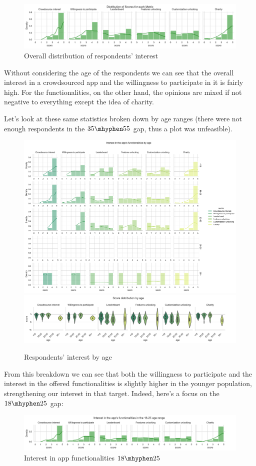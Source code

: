 \documentclass[a4paper, 11pt]{report}
\begin{document}
\begin{figure}[H]
	\centering
	\includegraphics[width=.9\textwidth]{img/analysis/distribution_of_scores_for_each_metric.pdf}
	\caption{Overall distribution of respondents' interest}
\end{figure}
\noindent Without considering the age of the respondents we can see that the
overall interest in a crowdsourced app and the willingness to participate in
it is fairly high. For the functionalities, on the other hand, the opinions are mixed if not negative
to everything except the idea of charity.

Let's look at these same statistics broken down by age ranges (there were not enough respondents in the $35 \mhyphen 55$ gap, thus a plot was unfeasible).
\begin{figure}[H]
	\centering
	\includegraphics[width=.8\textwidth]{img/analysis/interest_app_functionalities.pdf}\\
	\includegraphics[width=.9\textwidth]{img/analysis/score_distribution_by_age.pdf}
	\caption{Respondents' interest by age}
\end{figure}
From this breakdown we can see that both the willingness to participate and the interest in the offered functionalities is slightly higher in the younger population, strengthening our interest in that target.
Indeed, here's a focus on the $18 \mhyphen 25$ gap:  
\begin{figure}[H]
	\centering
	\includegraphics[width=.9\textwidth]{img/analysis/interest_app_functionalities_18_25.pdf}
	\caption{Interest in app functionalities $18 \mhyphen 25$}
\end{figure}
\end{document}

